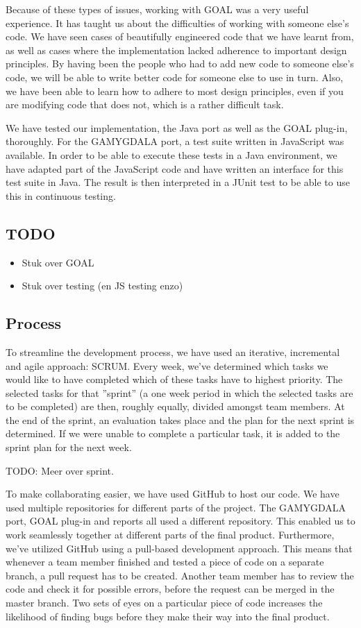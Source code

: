 Because of these types of issues, working with GOAL was a very useful experience. It has taught us about the difficulties of working with someone else's code. We have seen cases of beautifully engineered code that we have learnt from, as well as cases where the implementation lacked adherence to important design principles. By having been the people who had to add new code to someone else's code, we will be able to write better code for someone else to use in turn. Also, we have been able to learn how to adhere to most design principles, even if you are modifying code that does not, which is a rather difficult task.

We have tested our implementation, the Java port as well as the GOAL plug-in, thoroughly. For the GAMYGDALA port, a test suite written in JavaScript was available. In order to be able to execute these tests in a Java environment, we have adapted part of the JavaScript code and have written an interface for this test suite in Java. The result is then interpreted in a JUnit test to be able to use this in continuous testing.

\subsection*{TODO}
\begin{itemize}
\item Stuk over GOAL
\item Stuk over testing (en JS testing enzo)
\end{itemize}

\subsection{Process}
To streamline the development process, we have used an iterative, incremental and agile approach: SCRUM. Every week, we've determined which tasks we would like to have completed which of these tasks have to highest priority. The selected tasks for that ''sprint'' (a one week period in which the selected tasks are to be completed) are then, roughly equally, divided amongst team members. At the end of the sprint, an evaluation takes place and the plan for the next sprint is determined. If we were unable to complete a particular task, it is added to the sprint plan for the next week.

TODO: Meer over sprint.

To make collaborating easier, we have used GitHub to host our code. We have used multiple repositories for different parts of the project. The GAMYGDALA port, GOAL plug-in and reports all used a different repository. This enabled us to work seamlessly together at different parts of the final product. Furthermore, we've utilized GitHub using a pull-based development approach. This means that whenever a team member finished and tested a piece of code on a separate branch, a pull request has to be created. Another team member has to review the code and check it for possible errors, before the request can be merged in the master branch. Two sets of eyes on a particular piece of code increases the likelihood of finding bugs before they make their way into the final product. 

